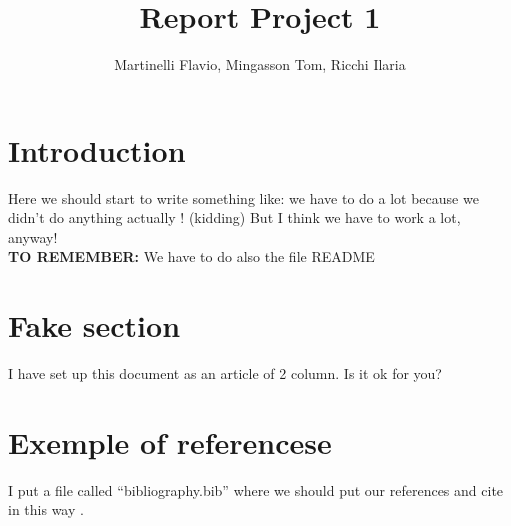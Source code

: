 \documentclass[a4paper,twocolumn]{article}
\title{Report Project 1}
\author{Martinelli Flavio, Mingasson Tom, Ricchi Ilaria}
\begin{document}
\maketitle

\section{Introduction}
Here we should start to write something like: we have to do a lot because we didn't do anything actually ! (kidding) But I think we have to work a lot, anyway!\\

\textbf{TO REMEMBER:} We have to do also the file README

\section{Fake section}
I have set up this document as an article of 2 column. Is it ok for you?

\section{Exemple of referencese}
I put a file called ``bibliography.bib'' where we should put our references and cite in this way \cite{internet}.

\printbibliography
\end{document}
